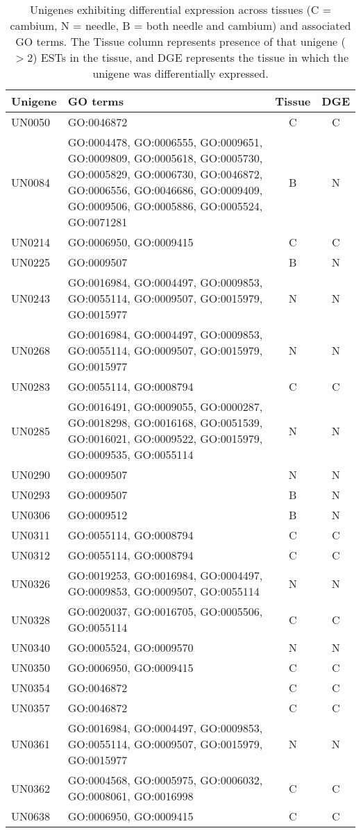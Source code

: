 \documentclass[11pt]{article}
\begin{document}
\begin{table}[t]
\centering
\begin{tabularx}{\textwidth}{lXcc}
\toprule 
Unigene & GO terms & Tissue & DGE \\ \midrule
UN0050 & GO:0046872 &  C   & C \\
UN0084 & GO:0004478, GO:0006555, GO:0009651, GO:0009809, GO:0005618, GO:0005730, GO:0005829, GO:0006730, GO:0046872, GO:0006556, GO:0046686, GO:0009409, GO:0009506, GO:0005886, GO:0005524, GO:0071281 & B   & N \\
UN0214 & GO:0006950, GO:0009415 &  C   & C \\
UN0225 & GO:0009507   &  B   & N \\
UN0243 & GO:0016984, GO:0004497, GO:0009853, GO:0055114, GO:0009507, GO:0015979, GO:0015977  & N   & N \\
UN0268 & GO:0016984, GO:0004497, GO:0009853, GO:0055114, GO:0009507, GO:0015979, GO:0015977 & N   & N \\
UN0283 & GO:0055114, GO:0008794 & C   & C \\
UN0285 & GO:0016491, GO:0009055, GO:0000287, GO:0018298, GO:0016168, GO:0051539, GO:0016021, GO:0009522, GO:0015979, GO:0009535, GO:0055114  & N   & N \\
UN0290 & GO:0009507   & N   & N \\
UN0293 & GO:0009507  & B   & N \\
UN0306 & GO:0009512 & B   & N \\
UN0311 & GO:0055114, GO:0008794  & C   & C \\
UN0312 & GO:0055114, GO:0008794 & C   & C \\
UN0326 & GO:0019253, GO:0016984, GO:0004497, GO:0009853, GO:0009507, GO:0055114 & N   & N \\
UN0328 & GO:0020037, GO:0016705, GO:0005506, GO:0055114 & C   & C \\
UN0340 & GO:0005524, GO:0009570 & N   & N \\
UN0350 & GO:0006950, GO:0009415 & C   & C \\
UN0354 & GO:0046872 & C   & C \\
UN0357 & GO:0046872 &  C   & C \\
UN0361 & GO:0016984, GO:0004497, GO:0009853, GO:0055114, GO:0009507, GO:0015979, GO:0015977 & N   & N \\
UN0362 & GO:0004568, GO:0005975, GO:0006032, GO:0008061, GO:0016998 & C   & C \\
UN0638 & GO:0006950, GO:0009415 & C & C \\ 
\bottomrule
\end{tabularx}

\caption{Unigenes exhibiting differential expression across tissues (C = cambium, N = needle, 
B = both needle and cambium) and associated GO terms. The Tissue column represents presence of 
that unigene ($>2$) ESTs in the tissue, and DGE represents the tissue in which the unigene was 
differentially expressed.}
\label{tab:dge_go}
\end{table}
\end{document}
